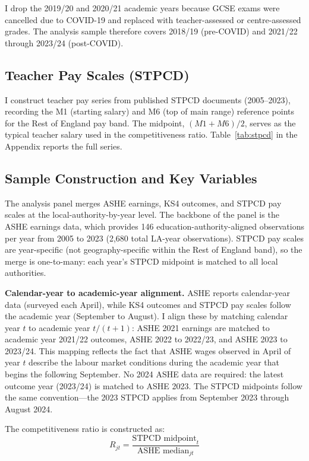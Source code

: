 \documentclass[12pt]{article}
\begin{document}
I drop the 2019/20 and 2020/21 academic years because GCSE exams were cancelled due to COVID-19 and replaced with teacher-assessed or centre-assessed grades. The analysis sample therefore covers 2018/19 (pre-COVID) and 2021/22 through 2023/24 (post-COVID).

\subsection{Teacher Pay Scales (STPCD)}

I construct teacher pay series from published STPCD documents (2005--2023), recording the M1 (starting salary) and M6 (top of main range) reference points for the Rest of England pay band. The midpoint, $(M1 + M6)/2$, serves as the typical teacher salary used in the competitiveness ratio. Table~\ref{tab:stpcd} in the Appendix reports the full series.

\subsection{Sample Construction and Key Variables}

The analysis panel merges ASHE earnings, KS4 outcomes, and STPCD pay scales at the local-authority-by-year level. The backbone of the panel is the ASHE earnings data, which provides 146 education-authority-aligned observations per year from 2005 to 2023 (2,680 total LA-year observations). STPCD pay scales are year-specific (not geography-specific within the Rest of England band), so the merge is one-to-many: each year's STPCD midpoint is matched to all local authorities.

\textbf{Calendar-year to academic-year alignment.} ASHE reports calendar-year data (surveyed each April), while KS4 outcomes and STPCD pay scales follow the academic year (September to August). I align these by matching calendar year $t$ to academic year $t/(t{+}1)$: ASHE 2021 earnings are matched to academic year 2021/22 outcomes, ASHE 2022 to 2022/23, and ASHE 2023 to 2023/24. This mapping reflects the fact that ASHE wages observed in April of year $t$ describe the labour market conditions during the academic year that begins the following September. No 2024 ASHE data are required: the latest outcome year (2023/24) is matched to ASHE 2023. The STPCD midpoints follow the same convention---the 2023 STPCD applies from September 2023 through August 2024.

The competitiveness ratio is constructed as:
\begin{equation}
R_{jt} = \frac{\text{STPCD midpoint}_t}{\text{ASHE median}_{jt}}
\end{equation}
\end{document}
